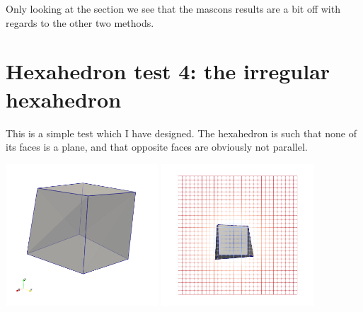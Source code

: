 Only looking at the section we see that the mascons results are 
a bit off with regards to the other two methods.


\section*{Hexahedron test 4: the irregular hexahedron}

This is a simple test which I have designed. The hexahedron is such that 
none of its faces is a plane, and that opposite faces are obviously 
not parallel. 

\begin{center}
\includegraphics[width=5.7cm]{python_codes/fieldstone_113/results/hex_test4/myblock_2}
\includegraphics[width=5.7cm]{python_codes/fieldstone_113/results/hex_test4/myblock_1}
\end{center}

